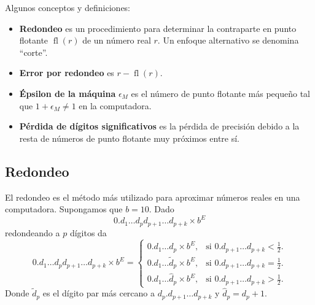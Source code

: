 \documentclass[a4paper,10pt]{scrartcl}
\theoremstyle{definition}
\begin{document}
Algunos conceptos y definiciones:

\begin{itemize}
    \item

          \textbf{Redondeo} es un procedimiento para determinar la
          contraparte en punto flotante
          \begin{math}
              \operatorname{fl}
              \left(r\right)
          \end{math}
          de un número real $r$.
          Un enfoque alternativo se denomina ``corte''.

    \item

          \textbf{Error por redondeo} es
          \begin{math}
              r-
              \operatorname{fl}
              \left(r\right)
          \end{math}.

    \item

          \textbf{Épsilon de la máquina} $\epsilon_{M}$ es el número
          de punto flotante más pequeño tal que
          \begin{math}
              1+\epsilon_{M}\neq
              1
          \end{math}
          en la computadora.

    \item

          \textbf{Pérdida de dígitos significativos} es la pérdida de
          precisión debido a la resta de números de punto flotante
          muy próximos entre sí.
\end{itemize}

\subsection{Redondeo}

El redondeo es el método más utilizado para aproximar números reales
en una computadora.
Supongamos que $b=10$.
Dado
\begin{equation*}
    0.d_{1}\dotsc d_{p}d_{p+1}\dotsc
    d_{p+k}\times b^{E}
\end{equation*}
redondeando a $p$ dígitos da
\begin{equation*}
    0.d_{1}\dotsc
    d_{p}d_{p+1}\dotsc
    d_{p+k}\times
    b^{E}=
    \begin{cases}
        0.d_{1}\dotsc
        d_{p}\times
        b^{E}, &
        \text{si }
        0.d_{p+1}\dotsc
        d_{p+k}<
        \frac{1}{2}. \\
        0.d_{1}\dotsc
        \widetilde{d}_{p}\times
        b^{E}, &
        \text{si }
        0.d_{p+1}\dotsc
        d_{p+k}=
        \frac{1}{2}. \\
        0.d_{1}\dotsc
        \widehat{d}_{p}\times
        b^{E}, &
        \text{si }
        0.d_{p+1}\dotsc
        d_{p+k}>
        \frac{1}{2}.
    \end{cases}
\end{equation*}
Donde $\widetilde{d}_{p}$ es el dígito par más cercano a
$d_{p}.d_{p+1}\dotsc d_{p+k}$ y $\widehat{d}_{p}=d_{p}+1$.
\end{document}
